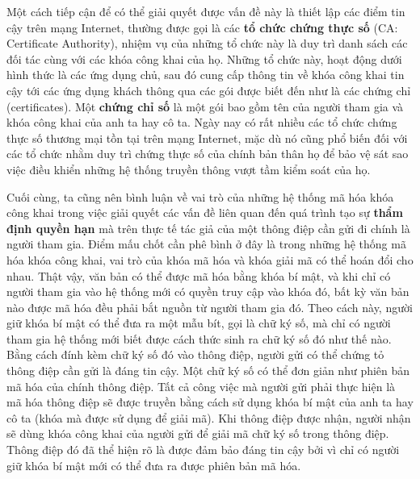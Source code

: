 Một cách tiếp cận để có thể giải quyết được vấn đề này là thiết lập các điểm tin cậy trên
mạng Internet, thường được gọi là các \textbf{tổ chức chứng thực số} (CA: Certificate
Authority), nhiệm vụ của những tổ chức này là duy trì danh sách các đối tác cùng với các
khóa công khai của họ. Những tổ chức này, hoạt động dưới hình thức là các ứng dụng chủ,
sau đó cung cấp thông tin về khóa công khai tin cậy tới các ứng dụng khách thông qua các
gói được biết đến như là các chứng chỉ (certificates). Một \textbf{chứng chỉ số} là một
gói bao gồm tên của người tham gia và khóa công khai của anh ta hay cô ta. Ngày nay có rất
nhiều các tổ chức chứng thực số thương mại tồn tại trên mạng Internet, mặc dù nó cũng phổ
biến đối với các tổ chức nhằm duy trì chứng thực số của chính bản thân họ để bảo vệ sát sao việc điều khiển những hệ thống truyền thông vượt tầm kiểm soát của họ.

Cuối cùng, ta cũng nên bình luận về vai trò của những hệ thống mã hóa khóa công khai
trong việc giải quyết các vấn đề liên quan đến quá trình tạo sự \textbf{thẩm định quyền
  hạn} mà trên thực tế tác giả của một thông điệp cần gửi đi chính là người tham gia. Điểm
mấu chốt cần phê bình ở đây là trong những hệ thống mã hóa khóa công khai, vai trò của
khóa mã hóa và khóa giải mã có thể hoán đổi cho nhau. Thật vậy, văn bản có thể được mã hóa
bằng khóa bí mật, và khi chỉ có người tham gia vào hệ thống mới có quyền truy cập vào khóa
đó, bất kỳ văn bản nào được mã hóa đều phải bắt nguồn từ người tham gia đó. Theo cách này,
người giữ khóa bí mật có thể đưa ra một mẫu bít, gọi là chữ ký số, mà chỉ có người tham
gia hệ thống mới biết được cách thức sinh ra chữ ký số đó như thế nào. Bằng cách đính kèm
chữ ký số đó vào thông điệp, người gửi có thể chứng tỏ thông điệp cần gửi là đáng tin
cậy. Một chữ ký số có thể đơn giản như phiên bản mã hóa của chính thông điệp. Tất cả công
việc mà người gửi phải thực hiện là mã hóa thông điệp sẽ được truyền bằng cách sử dụng
khóa bí mật của anh ta hay cô ta (khóa mà được sử dụng để giải mã). Khi thông điệp được
nhận, người nhận sẽ dùng khóa công khai của người gửi để giải mã chữ ký số trong thông
điệp. Thông điệp đó đã thể hiện rõ là được đảm bảo đáng tin cậy bởi vì chỉ có người giữ khóa bí
mật mới có thể đưa ra được phiên bản mã hóa.

